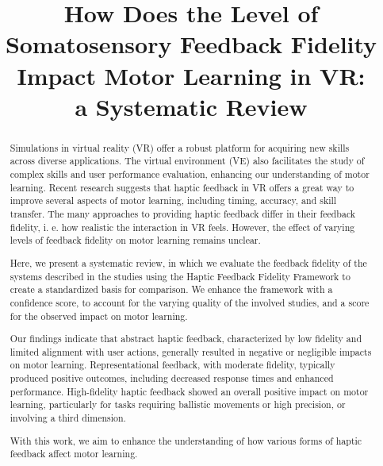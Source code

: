 \documentclass[conference]{IEEEtran}
\begin{document}
\title{How Does the Level of Somatosensory Feedback Fidelity Impact Motor Learning in VR: \\a Systematic Review}

\author{
\and
{}
\and
{}
}

\maketitle

\begin{abstract}
Simulations in virtual reality (VR) offer a robust platform for acquiring new skills across diverse applications. The virtual environment (VE) also facilitates the study of complex skills and user performance evaluation, enhancing our understanding of motor learning. Recent research suggests that haptic feedback in VR offers a great way to improve several aspects of motor learning, including timing, accuracy, and skill transfer. The many approaches to providing haptic feedback differ in their feedback fidelity, i. e. how realistic the interaction in VR feels. However, the effect of varying levels of feedback fidelity on motor learning remains unclear. 

Here, we present a systematic review, in which we evaluate the feedback fidelity of the systems described in the studies using the Haptic Feedback Fidelity Framework to create a standardized basis for comparison. We enhance the framework with a confidence score, to account for the varying quality of the involved studies, and a score for the observed impact on motor learning.

Our findings indicate that abstract haptic feedback, characterized by low fidelity and limited alignment with user actions, generally resulted in negative or negligible impacts on motor learning. Representational feedback, with moderate fidelity, typically produced positive outcomes, including decreased response times and enhanced performance. High-fidelity haptic feedback showed an overall positive impact on motor learning, particularly for tasks requiring ballistic movements or high precision, or involving a third dimension.

With this work, we aim to enhance the understanding of how various forms of haptic feedback affect motor learning.

\end{abstract}
\end{document}
